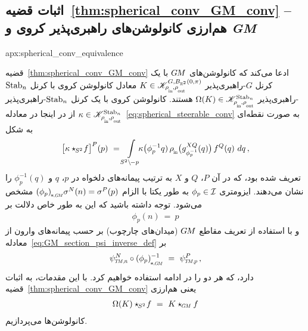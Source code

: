\toclesslab\subsection{اثبات قضیه~\ref{thm:spherical_conv_GM_conv} -- هم‌ارزی کانولوشن‌های راهبری‌پذیر کروی و \textit{GM}}{apx:spherical_conv_equivalence}


قضیه~\ref{thm:spherical_conv_GM_conv} ادعا می‌کند که کانولوشن‌های $G\mkern-1.4muM$ با یک کرنل $G$-راهبری‌پذیر $K \in \mathscr{K}^{G,B_{\R^2}(0,\pi)}_{\rhoin\mkern-1mu,\rhoout}$ معادل کانولوشن کروی با کرنل $\operatorname{Stab}_{n}$-راهبری‌پذیر $\Omega(K) \in \mathscr{K}^{\Stab{n}}_{\rhoin\mkern-1mu,\rhoout}$ هستند.
کانولوشن کروی با یک کرنل $\operatorname{Stab}_{n}$-راهبری‌پذیر $\kappa \in \mathscr{K}^{\Stab{n}}_{\rhoin\mkern-1mu,\rhoout}$ از \citet{Cohen2018-intertwiners,Cohen2019-generaltheory} در اینجا در معادله~\eqref{eq:spherical_steerable_conv} به صورت نقطه‌ای به شکل
\begin{align}
    \big[\kappa \star_{\mkern-2mu S^2}\! f\big]^P(p)
    \ = \int\limits_{S^2 \backslash \mkern-2mu -p} \mkern-8mu \kappa\big(\phi_p^{-1}q)\, \rhoin\big( g_{\phi_p^{-1}}^{XQ}(q) \big)\, f^Q(q)\ dq \,,
\end{align}
تعریف شده بود، که در آن $P$، $Q$ و $X$ به ترتیب پیمانه‌های دلخواه در $p$، $q$ و $\phi_p^{-1}(q)$ را نشان می‌دهند.
ایزومتری $\phi_p \in \mathcal{I}$ به طور یکتا با الزام $\dphipGM \sigma^N(n) = \sigma^P(p)$ مشخص می‌شود.
توجه داشته باشید که این به طور خاص دلالت بر
\begin{align}\label{eq:phipn_sphere_action}
    \phi_p(n) \ =\ p
\end{align}
و با استفاده از تعریف مقاطع $G\mkern-1.4muM$ (میدان‌های چارچوب) بر حسب پیمانه‌های وارون از معادله~\eqref{eq:GM_section_psi_inverse_def} بر
\begin{align}\label{eq:phipn_gauges}
    \psiTMn^N \circ \dphipGM^{-1} \ =\ \psiTMp^P \,,
\end{align}
دارد، که هر دو را در ادامه استفاده خواهیم کرد.
با این مقدمات، به اثبات قضیه~\ref{thm:spherical_conv_GM_conv} یعنی هم‌ارزی
\begin{align}
    \Omega(K) \star_{\mkern-2mu S^2}\! f\ =\ K \star_{\mkern-1mu\scalebox{.64}{$\GM$}} f
\end{align}
کانولوشن‌ها می‌پردازیم.

